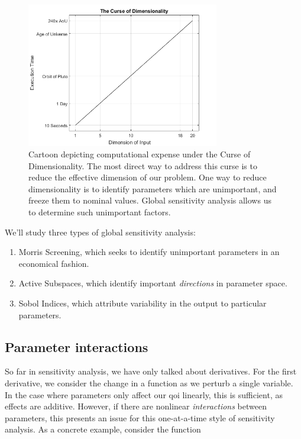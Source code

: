 \documentclass[../primer.tex]{subfiles}
\begin{document}
\begin{figure}[!ht]
  \centering
  \includegraphics[width=0.75\textwidth]{./images/curse_of_dimensionality}
  \caption{Cartoon depicting computational expense under the Curse of Dimensionality.
  The most direct way to address this curse is to reduce the effective dimension
  of our problem. One way to reduce dimensionality is to identify parameters
  which are unimportant, and freeze them to nominal values. Global sensitivity
  analysis allows us to determine such unimportant factors.}
  \label{fig:curse}
\end{figure}

We'll study three types of global sensitivity analysis:
\begin{enumerate}
\item Morris Screening, which seeks to identify unimportant parameters in an economical fashion.
\item Active Subspaces, which identify important \emph{directions} in parameter space.
\item Sobol Indices, which attribute variability in the output to particular parameters.
\end{enumerate}

\subsection{Parameter interactions}
\label{sec:org87ec37f}
So far in sensitivity analysis, we have only talked about derivatives. For the
first derivative, we consider the change in a function as we perturb a single
variable. In the case where parameters only affect our qoi linearly, this is
sufficient, as effects are additive. However, if there are nonlinear
\emph{interactions} between parameters, this presents an issue for this one-at-a-time
style of sensitivity analysis. As a concrete example, consider the function
\end{document}
